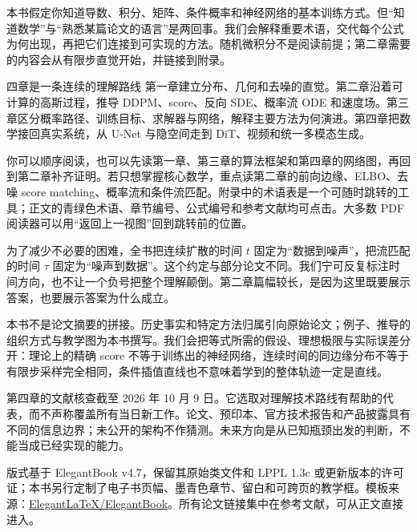 \documentclass[lang=cn,chinesefont=nofont,scheme=chinese,11pt,
 color=blue,mode=fancy,device=pad,bibend=biber]{elegantbook}
\begin{document}
本书假定你知道导数、积分、矩阵、条件概率和神经网络的基本训练方式。但“知道数学”与“熟悉某篇论文的语言”是两回事。我们会解释重要术语，交代每个公式为何出现，再把它们连接到可实现的方法。随机微积分不是阅读前提；第二章需要的内容会从有限步直觉开始，并链接到附录。

\begin{keybox}{四章是一条连续的理解路线}
第一章建立分布、几何和去噪的直觉。第二章沿着可计算的高斯过程，推导 DDPM、score、反向 SDE、概率流 ODE 和速度场。第三章区分概率路径、训练目标、求解器与网络，解释主要方法为何演进。第四章把数学接回真实系统，从 U-Net 与隐空间走到 DiT、视频和统一多模态生成。
\end{keybox}

你可以顺序阅读，也可以先读第一章、第三章的算法框架和第四章的网络图，再回到第二章补齐证明。若只想掌握核心数学，重点读第二章的前向边缘、ELBO、去噪 score matching、概率流和条件流匹配。附录中的术语表是一个可随时跳转的工具；正文的青绿色术语、章节编号、公式编号和参考文献均可点击。大多数 PDF 阅读器可以用“返回上一视图”回到跳转前的位置。

为了减少不必要的困难，全书把连续扩散的时间 $t$ 固定为“数据到噪声”，把流匹配的时间 $\tau$ 固定为“噪声到数据”。这个约定与部分论文不同。我们宁可反复标注时间方向，也不让一个负号把整个理解颠倒。第二章篇幅较长，是因为这里既要展示答案，也要展示答案为什么成立。

本书不是论文摘要的拼接。历史事实和特定方法归属引向原始论文；例子、推导的组织方式与教学图为本书撰写。我们会把等式所需的假设、理想极限与实际误差分开：理论上的精确 score 不等于训练出的神经网络，连续时间的同边缘分布不等于有限步采样完全相同，条件插值直线也不意味着学到的整体轨迹一定是直线。

第四章的文献核查截至 2026 年 10 月 9 日。它选取对理解技术路线有帮助的代表，而不声称覆盖所有当日新工作。论文、预印本、官方技术报告和产品披露具有不同的信息边界；未公开的架构不作猜测。未来方向是从已知瓶颈出发的判断，不能当成已经实现的能力。

版式基于 ElegantBook v4.7，保留其原始类文件和 LPPL 1.3c 或更新版本的许可证；本书另行定制了电子书页幅、墨青色章节、留白和可跨页的教学框。模板来源：\href{https://github.com/ElegantLaTeX/ElegantBook}{ElegantLaTeX/ElegantBook}。所有论文链接集中在参考文献，可从正文直接进入。
\tableofcontents
\end{document}
